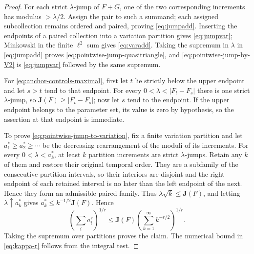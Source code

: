 \documentclass[11pt]{article}
\numberwithin{equation}{section}
\theoremstyle{remark}
\theoremstyle{definition}
\begin{document}
\begin{proof}
For each strict $\lambda$-jump of $F+G$, one of the two corresponding
increments has modulus $>\lambda/2$.  Assign the pair to such a summand;
each assigned subcollection remains ordered and paired, proving
\eqref{eq:jumpadd}.  Inserting the endpoints of a paired collection into a
variation partition gives \eqref{eq:jumpvar}; Minkowski in the finite
$\ell^2$ sum gives \eqref{eq:varadd}.  Taking the supremum in $\lambda$ in
\eqref{eq:jumpadd} proves \eqref{eq:pointwise-jump-quasitriangle}, and
\eqref{eq:pointwise-jump-by-V2} is \eqref{eq:jumpvar} followed by the same
supremum.

For \eqref{eq:anchor-controls-maximal}, first let $t$ lie strictly below the
upper endpoint and let $s>t$ tend to that endpoint.  For every
$0<\lambda<|F_t-F_s|$ there is one strict $\lambda$-jump, so
$\mathbf J(F)\ge|F_t-F_s|$; now let $s$ tend to the endpoint.  If the
upper endpoint belongs to the parameter set, its value is zero by
hypothesis, so the assertion at that endpoint is immediate.

To prove \eqref{eq:pointwise-jump-to-variation}, fix a finite variation
partition and let $a_1^*\ge a_2^*\ge\cdots$ be the decreasing rearrangement
of the moduli of its increments.  For every $0<\lambda<a_k^*$, at least
$k$ partition increments are strict $\lambda$-jumps.  Retain any $k$ of
them and restore their original temporal order.  They are a subfamily of
the consecutive partition intervals, so their interiors are disjoint and
the right endpoint of each retained interval is no later than the left
endpoint of the next.  Hence they form an admissible paired family.  Thus
$\lambda\sqrt{k}\le\mathbf J(F)$, and letting
$\lambda\uparrow a_k^*$ gives $a_k^*\le k^{-1/2}\mathbf J(F)$.  Hence
\[
 \left(\sum_i a_i^r\right)^{1/r}
 \le\mathbf J(F)\left(\sum_{k=1}^\infty k^{-r/2}\right)^{1/r}.
\]
Taking the supremum over partitions proves the claim.  The numerical bound
in \eqref{eq:kappa-r} follows from the integral test.


\end{proof}
\end{document}
